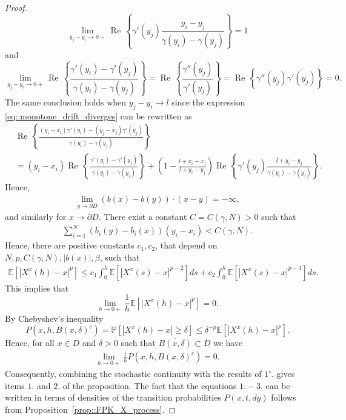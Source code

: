 \documentclass[10pt,a4paper]{amsart}
\renewcommand{\Re}{\operatorname{Re}\,}
\begin{document}
\begin{proof}
\[
    \lim\limits_{y_{j}-y_{i}\to 0+}\Re\left\{\gamma'(y_{j})\frac{y_{i}-y_{j}}{\gamma(y_{i})-\gamma(y_{j})}\right\} = 1
\]
and 
\[
     \lim\limits_{y_{j}-y_{i}\to 0+}  \Re\left\{\frac{\gamma'(y_{i})-\gamma'(y_{j})}{\gamma(y_{i})-\gamma(y_{j})}\right\} 
     = \Re\left\{\frac{\gamma''(y_{j})}{\gamma'(y_{j})}\right\} 
     =  \Re\left\{\gamma''(y_{j}) \overline{\gamma'(y_{j})}\right\} 
     =0.
\]
The same conclusion holds when $y_{j}-y_{i}\to l$ since the expression \eqref{eq::monotone_drift_diverges} can be rewritten as
\begin{align*}
    &\Re\left\{\frac{(y_{i}-x_{i})\gamma'(y_{i})-(y_{j}-x_{j})\gamma'(y_{j})}{\gamma(y_{i})-\gamma(y_{j})}\right\} \\
    &= (y_{i}-x_{i})\Re\left\{\frac{\gamma'(y_{i})-\gamma'(y_{j})}{\gamma(y_{i})-\gamma(y_{j})}\right\}+ \left(1 - \frac{l+x_{i}-x_{j}}{l+y_{i}-y_{j}}\right)\Re\left\{\gamma'(y_{j})\frac{l+y_{i}-y_{j}}{\gamma(y_{i})-\gamma(y_{j})}\right\}.
\end{align*}
Hence, 
\begin{align*}
    \lim\limits_{y\to \partial D}(b(x)-b(y))\cdot (x-y)= -\infty,
\end{align*}
and similarly for $x\to\partial D$. There exist a constant $C=C(\gamma, N)>0$ such that 
\begin{align*}
    \sum\limits_{i=1}^{N}(b_{i}(y)-b_{i}(x))(y_{i}-x_{i}) < C(\gamma, N).
\end{align*}
Hence, there are positive constants $c_{1},c_{2}$, that depend on $N,p, C(\gamma, N), |b(x)|, \beta $, such that 
\begin{align*}
    \mathbb{E}\left[|X^{x}(h)-x|^{p}\right] 
    \le c_{1} \int_{0}^{h}\mathbb{E}\left[|X^{x}(s)-x|^{p-2}\right]ds 
    + c_{2} \int_{0}^{h}\mathbb{E}\left[|X^{x}(s)-x|^{p-1}\right]ds.
\end{align*}
This implies that 
\[
    \lim\limits_{h\to 0+}\frac{1}{h}\mathbb{E}\left[|X^{x}(h)-x|^{p}\right] =0.
\]
By Chebyshev's inequality
\[
    P(x,h,B(x,\delta)^{c}) 
    = \mathbb{P}[|X^{x}(h)-x|\ge \delta]
    \le \delta^{-p}\mathbb{E}\left[|X^{x}(h)-x|^{p}\right].
\]
Hence, for all $x\in D$ and $\delta > 0$ such that $\overline{B(x,\delta)}\subset D$ we have
\begin{align*}
    \lim\limits_{h\to 0+}\frac{1}{h}P(x,h,B(x,\delta)^{c})=0.
\end{align*}
Consequently, combining the stochastic continuity with the results of $1^{\circ}.$ gives items $1.$ and $2.$ of the proposition. The fact that the equations $1.-3.$ can be written in terms of densities of the transition probabilities $P(x,t,dy)$ follows from Proposition~\ref{prop::FPK_X_process}.
\end{proof}
\end{document}
